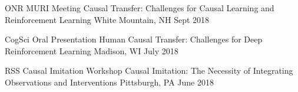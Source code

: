 


\begin{cventries}


\cventry
{ONR MURI Meeting} %
{Causal Transfer: Challenges for Causal Learning and Reinforcement Learning} %
{White Mountain, NH} %
{Sept 2018} %
{ %
}
\vspace{-4mm}


\cventry
{CogSci Oral Presentation} %
{Human Causal Transfer: Challenges for Deep Reinforcement Learning} %
{Madison, WI} %
{July 2018} %
{ %
}
\vspace{-4mm}


\cventry
{RSS Causal Imitation Workshop} %
{Causal Imitation: The Necessity of Integrating Observations and Interventions} %
{Pittsburgh, PA} %
{June 2018} %
{ %
}
\vspace{-4mm}



\end{cventries}
